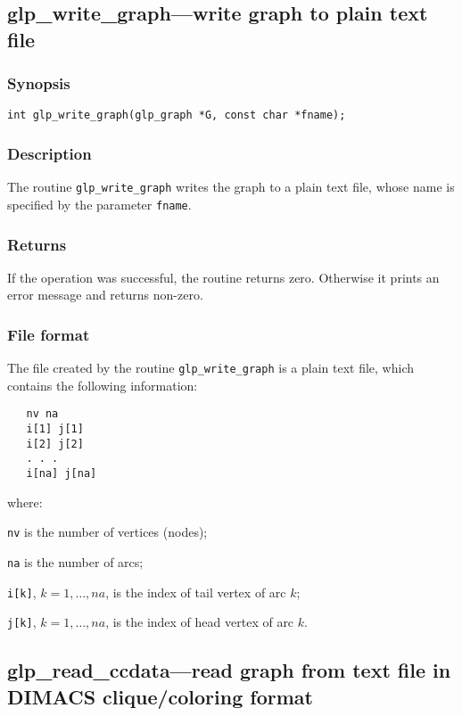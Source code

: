 \documentclass[dvipdfm,11pt]{report}
\begin{document}
\subsection{glp\_write\_graph---write graph to plain text file}

\subsubsection*{Synopsis}

\begin{verbatim}
int glp_write_graph(glp_graph *G, const char *fname);
\end{verbatim}

\subsubsection*{Description}

The routine \verb|glp_write_graph| writes the graph to a plain text
file, whose name is specified by the parameter \verb|fname|.

\subsubsection*{Returns}

If the operation was successful, the routine returns zero. Otherwise
it prints an error message and returns non-zero.

\subsubsection*{File format}

The file created by the routine \verb|glp_write_graph| is a plain text
file, which contains the following information:

\begin{verbatim}
   nv na
   i[1] j[1]
   i[2] j[2]
   . . .
   i[na] j[na]
\end{verbatim}

\noindent
where:

\noindent
\verb|nv| is the number of vertices (nodes);

\noindent
\verb|na| is the number of arcs;

\noindent
\verb|i[k]|, $k=1,\dots,na$, is the index of tail vertex of arc $k$;

\noindent
\verb|j[k]|, $k=1,\dots,na$, is the index of head vertex of arc $k$.

\subsection{glp\_read\_ccdata---read graph from text file in DIMACS
clique/coloring format}
\end{document}
